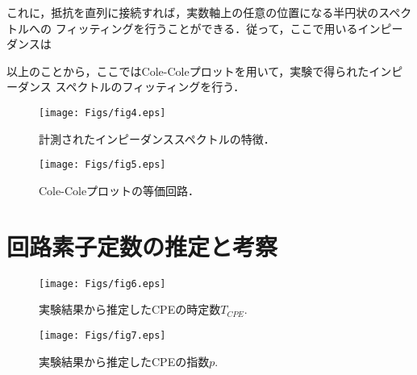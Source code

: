 \documentclass{jsce}
\begin{document}
これに，抵抗を直列に接続すれば，実数軸上の任意の位置になる半円状のスペクトルへの
フィッティングを行うことができる．従って，ここで用いるインピーダンスは

以上のことから，ここではCole-Coleプロットを用いて，実験で得られたインピーダンス
スペクトルのフィッティングを行う．

\begin{figure}[h]
	\begin{center}
	\texttt{[image: Figs/fig4.eps]} 
	\end{center}
	\caption{
		計測されたインピーダンススペクトルの特徴．
	} 
	\label{fig:fig4}
\end{figure}
\begin{figure}[h]
	\begin{center}
	\texttt{[image: Figs/fig5.eps]} 
	\end{center}
	\caption{
		Cole-Coleプロットの等価回路．
	} 
	\label{fig:fig5}
\end{figure}
\section{回路素子定数の推定と考察 }
\begin{figure}[h]
	\begin{center}
	\texttt{[image: Figs/fig6.eps]} 
	\end{center}
	\caption{
		実験結果から推定したCPEの時定数$T_{CPE}$.
	} 
	\label{fig:fig6}
\end{figure}
\begin{figure}[h]
	\begin{center}
	\texttt{[image: Figs/fig7.eps]} 
	\end{center}
	\caption{
		実験結果から推定したCPEの指数$p$.
	} 
	\label{fig:fig7}
\end{figure}
\end{document}
